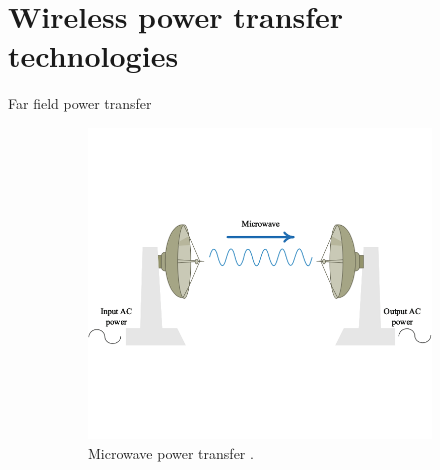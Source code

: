 

\section{Wireless power transfer technologies}

Far field power transfer
\begin{figure}[htbp]
    \begin{subfigure}{0.5\textwidth}
        \centering
        \includegraphics[width=0.9\linewidth]{images/1_microwave_power_transfer.png}
        \caption{Microwave power transfer \cite{Orekan}.}
        \label{fig:subim1}
    \end{subfigure}
    \begin{subfigure}{0.5\textwidth}
        \centering

\end{subfigure}
\end{figure}
